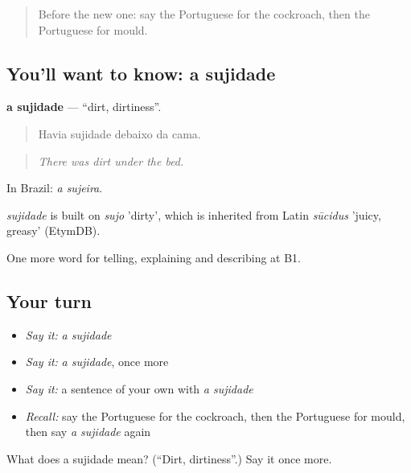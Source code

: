 \begin{quote}
Before the new one: say the Portuguese for the cockroach, then the Portuguese for mould.
\end{quote}

\subsection*{You'll want to know: a sujidade}
\textbf{a sujidade} — \textquotedblleft{}dirt, dirtiness\textquotedblright{}.

\begin{quote}
Havia sujidade debaixo da cama.
\end{quote}

\begin{quote}
\emph{There was dirt under the bed.}
\end{quote}

In Brazil: \emph{a sujeira}.

\begin{cousinweb}
\emph{sujidade} is built on \emph{sujo} 'dirty', which is inherited from Latin \emph{sūcidus} 'juicy, greasy' (EtymDB).
\end{cousinweb}

\begin{grammarlens}[title={What you've built}]
One more word for telling, explaining and describing at B1.
\end{grammarlens}

\subsection*{Your turn}
\begin{itemize}
\raggedright
  \item \emph{Say it:} \emph{a sujidade}
  \item \emph{Say it:} \emph{a sujidade}, once more
  \item \emph{Say it:} a sentence of your own with \emph{a sujidade}
  \item \emph{Recall:} say the Portuguese for the cockroach, then the Portuguese for mould, then say \emph{a sujidade} again
\end{itemize}

\begin{tcolorbox}[breakable,colback=teal!4,colframe=teal!35!black,title={Before you move on}]
What does a sujidade mean? (\textquotedblleft{}Dirt, dirtiness\textquotedblright{}.) Say it once more.
\end{tcolorbox}
